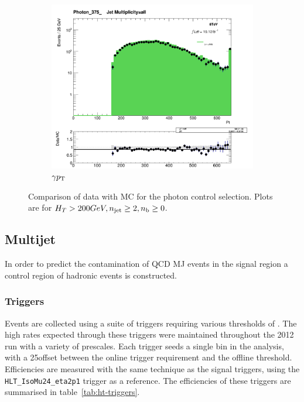\begin{figure}[!ht]
  \centering
    \begin{subfigure}[b]{0.48\textwidth}
      \includegraphics[width=\textwidth]{Figs/datamc/pho/Stacked_PhotonPt_all_Photon_375_upwards}
      \caption{$\gamma {p_{\text T}}$}
    \end{subfigure}
    \caption{\label{fig:datamc_pho_inc}
    Comparison of data with MC for the photon control selection. Plots 
    are for $H_T>200GeV, n_{\text{jet}}\geq2, n_{\text{b}}\geq0$.
    }
\end{figure}

\subsection{Multijet}
In order to predict the contamination of QCD MJ events in the signal region a 
control region of hadronic events is constructed.

\subsubsection{Triggers}
Events are collected using a suite of triggers requiring various thresholds of 
\HT. The high rates expected through these triggers were maintained throughout 
the 2012 run with a variety of prescales. Each trigger seeds a single \HT bin in
the analysis, with a 25\gev offset between the online trigger requirement and 
the offline threshold. Efficiencies are measured with the same technique as the
signal triggers, using the \verb!HLT_IsoMu24_eta2p1! trigger as a reference. 
The efficiencies of these triggers are summarised in table~\ref{tab:ht-triggers}.

